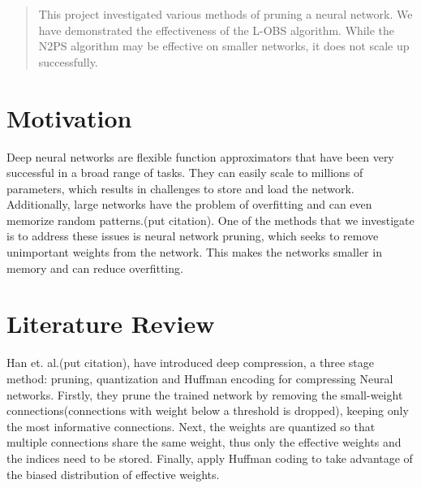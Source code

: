 \documentclass{article}
\begin{document}

\printAffiliationsAndNotice{}

\begin{abstract}
This project investigated various methods of pruning a neural network. We have demonstrated the effectiveness of the L-OBS algorithm. While the N2PS algorithm may be effective on smaller networks, it does not scale up successfully. 
\end{abstract}

\section{Motivation}
\label{Motivation}
Deep neural networks are flexible function approximators that have been very successful in a
broad range of tasks. They can easily scale to millions of parameters, which results in challenges to store and load the network. Additionally, large networks have the problem of overfitting and can even memorize random patterns.(put citation). One of the methods that we investigate is to address these issues is neural network pruning, which seeks to remove unimportant weights from the network. This makes the networks smaller in memory and can reduce overfitting. 
\section{Literature Review}
\label{Literature Review}
Han et. al.(put citation), have introduced deep compression, a three stage method: pruning, quantization and Huffman encoding for compressing Neural networks. Firstly, they prune the trained network by removing the small-weight connections(connections with weight below a threshold is dropped), keeping only the most informative connections. Next, the weights are quantized so that multiple connections share the same weight, thus only the effective weights and the indices need to be stored. Finally, apply Huffman coding to take advantage of the biased distribution of effective weights.
\end{document}
